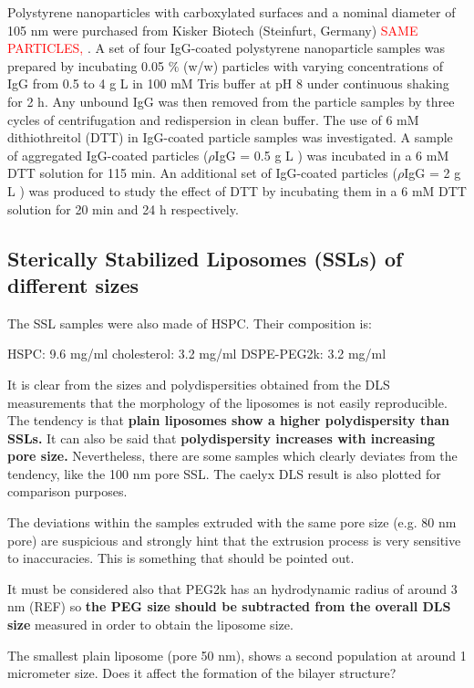 Polystyrene nanoparticles with carboxylated surfaces and a nominal diameter of 105 nm were purchased from Kisker Biotech (Steinfurt, Germany) \textcolor{red}{SAME PARTICLES, \cite{minelli_characterization_2014}}. A set of four IgG-coated polystyrene nanoparticle samples was prepared by incubating 0.05 $\%$ (w/w) particles with varying concentrations of IgG from 0.5 to 4 g L in 100 mM Tris buffer at pH 8 under continuous shaking for 2 h. Any unbound IgG was then removed from the particle samples by three cycles of centrifugation and redispersion in clean buffer. The use of 6 mM dithiothreitol (DTT) in IgG-coated particle samples was investigated. A sample of aggregated IgG-coated particles ($\rho$IgG = 0.5 g L ) was incubated in a 6 mM DTT solution for 115 min. An additional set of IgG-coated particles ($\rho$IgG = 2 g L ) was produced to study the effect of DTT by incubating them in a 6 mM DTT solution for 20 min and 24 h respectively.


\subsection{Sterically Stabilized Liposomes (SSLs) of different sizes}

The SSL samples were also made of HSPC. Their composition is:

HSPC: 9.6 mg/ml
cholesterol: 3.2 mg/ml
DSPE-PEG2k: 3.2 mg/ml

It is clear from the sizes and polydispersities obtained from the DLS measurements that the morphology of the liposomes is not easily reproducible. The tendency is that \textbf{plain liposomes show a higher polydispersity than SSLs.} It can also be said that \textbf{polydispersity increases with increasing pore size.} Nevertheless, there are some samples which clearly deviates from the tendency, like the 100 nm pore SSL. The caelyx DLS result is also plotted for comparison purposes.

The deviations within the samples extruded with the same pore size (e.g. 80 nm pore) are suspicious and strongly hint that the extrusion process is very sensitive to inaccuracies. This is something that should be pointed out.

It must be considered also that PEG2k has an hydrodynamic radius of around 3 nm (REF) so \textbf{the PEG size should be subtracted from the overall DLS size} measured in order to obtain the liposome size.

The smallest plain liposome (pore 50 nm), shows a second population at around 1 micrometer size. Does it affect the formation of the bilayer structure?

